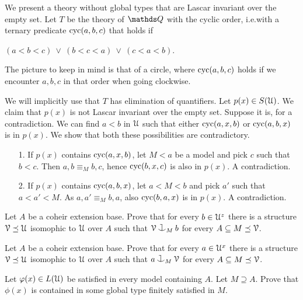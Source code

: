 \documentclass[creche.tex]{subfiles}
\begin{document}
\begin{example}\label{ex_circ_order}
  We present a theory without global types that are Lascar invariant over the empty set.
  Let $T$ be the theory of $\QQ$ with the cyclic order, i.e.\@ with a ternary predicate ${\rm cyc}(a, b, c)$ that  holds if

  \hfil $(a < b < c)\ \vee\ (b < c < a)\ \vee\ (c < a < b)$.

  The picture to keep in mind is that of a circle, where ${\rm cyc}(a, b, c)$ holds if we encounter $a,b,c$ in that order when going clockwise.

  We will implicitly use that $T$ has elimination of quantifiers.
  Let $p(x)\in S(\EuScript U)$.
  We claim that $p(x)$ is not Lascar invariant over the empty set.
  Suppose it is, for a contradiction.
  We can find $a<b$ in $\EuScript U$ such that either ${\rm cyc}(a, x, b)$ or ${\rm cyc}(a, b, x)$ is in $p(x)$.
  We show that both these possibilities are contradictory.
  \begin{itemize}
  \item[1.] If $p(x)$ contains ${\rm cyc}(a, x, b)$,
  let $M<a$ be a model and pick $c$ such that $b<c$.
  Then $a, b \equiv_M b, c$, hence ${\rm cyc}(b, x, c)$ is also in $p(x)$.
  A contradiction.
  \item[2.] If $p(x)$ contains ${\rm cyc}(a, b, x)$,
  let $a<M<b$ and pick $a'$ such that $a<a'<M$. 
  As $a, a' \equiv_M b,a$, also  ${\rm cyc}(b, a, x)$ is in $p(x)$.
  A contradiction.\QED
  \end{itemize}
\end{example}

\begin{exercise}
  Let $A$ be a coheir extension base.
  Prove that for every $b\in\EuScript U^z$ there is a structure $\EuScript V\preceq\EuScript U$ isomophic to $\EuScript U$ over $A$ such that $\V\cnonfork_Mb$ for every $A\subseteq M\preceq\EuScript V$.\QED
\end{exercise}

\begin{exercise}
  Let $A$ be a coheir extension base.
  Prove that for every $a\in\EuScript U^x$ there is a structure $\EuScript V\preceq\EuScript U$ isomophic to $\EuScript U$ over $A$ such that $a\cnonfork_M\V$ for every $A\subseteq M\preceq\EuScript V$.\QED
\end{exercise}


\begin{exercise}
  Let $\varphi(x)\in L(\EuScript U)$ be satisfied in every model containing $A$.  
  Let $M\supseteq A$.  
  Prove that $\phi(x)$ is contained in some global type finitely satisfied in $M$.\QED
\end{exercise}
\end{document}
